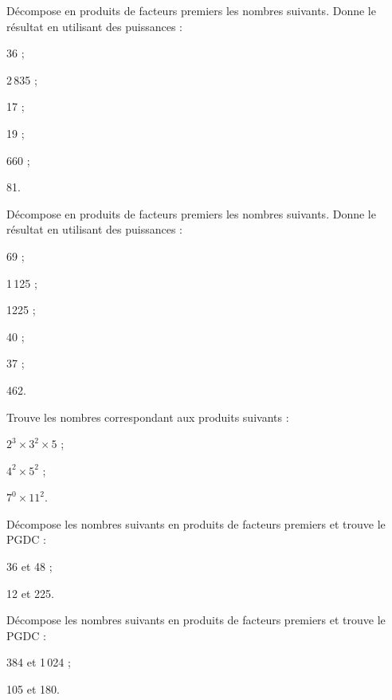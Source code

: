 \begin{exercice}
Décompose en produits de facteurs premiers les nombres suivants. Donne le résultat en utilisant des puissances :
\begin{colenumerate}{3}
 \item 36 ;
 \item 2\,835 ;
 \item 17 ;
 \item 19 ;
 \item 660 ;
 \item 81.
  \end{colenumerate}
\end{exercice} 

\begin{exercice}
Décompose en produits de facteurs premiers les nombres suivants. Donne le résultat en utilisant des puissances :
\begin{colenumerate}{3}
 \item 69 ;
 \item 1\,125 ;
 \item 1225 ;
 \item 40 ;
 \item 37 ;
 \item 462.
 \end{colenumerate}
\end{exercice} 

\begin{exercice}
Trouve les nombres correspondant aux produits suivants :
\begin{colenumerate}{3}
 \item $2^3 \times 3^2 \times 5$ ;
 \item $4^2 \times 5^2$ ;
 \item $7^0 \times 11^2$.
 \end{colenumerate}
\end{exercice} 

\begin{exercice}
Décompose les nombres suivants en produits de facteurs premiers et trouve le PGDC :
\begin{colenumerate}{2}
 \item 36 et 48 ;
 \item 12 et 225.
 \end{colenumerate}
\end{exercice} 

\begin{exercice}
Décompose les nombres suivants en produits de facteurs premiers et trouve le PGDC :
\begin{colenumerate}{2}
 \item 384 et 1\,024 ;
 \item 105 et 180.
 \end{colenumerate}
\end{exercice} 

